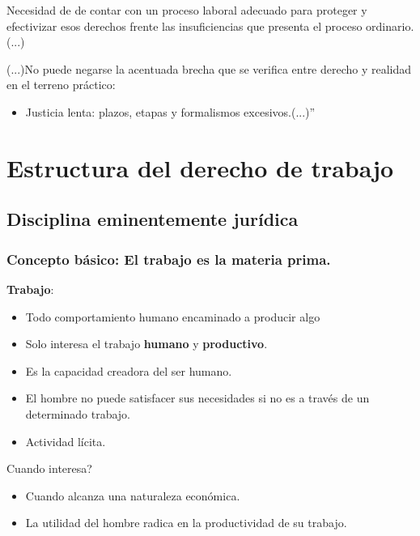 \documentclass[spanish,12pt,a4paper,titlepage]{report}
\begin{document}
Necesidad de de contar con un proceso laboral adecuado para proteger y efectivizar esos derechos frente las insuficiencias que presenta el proceso ordinario.(...)


(...)No puede negarse la acentuada brecha que se verifica entre derecho y realidad en el terreno práctico:
\begin{itemize}
\item Justicia lenta: plazos, etapas y formalismos excesivos.(...)''
\end{itemize}

\part{Estructura del derecho de trabajo}

\chapter{Disciplina eminentemente jurídica}

\section{Concepto básico: El trabajo es la materia prima.}

\textbf{Trabajo}:
\begin{itemize}
\item Todo comportamiento humano encaminado a producir algo
\item Solo interesa el trabajo \textbf{humano} y \textbf{productivo}.
\item Es la capacidad creadora del ser humano.
\item El hombre no puede satisfacer sus necesidades si no es a través de un determinado trabajo.
\item Actividad lícita.
\end{itemize}

Cuando interesa?
\begin{itemize}
\item Cuando alcanza una naturaleza económica.
\item La utilidad del hombre radica en la productividad de su trabajo.
\end{itemize}
\end{document}
